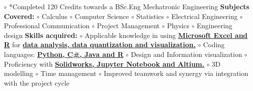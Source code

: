 \documentclass[10pt,a4paper,ragged2e,withhyper]{altacv}
\begin{document}
\begin{adjustbox}{valign=t}
\begin{minipage}{0.6\textwidth}
\begin{description}
                          \textcolor{ColorOne}{$\circ$} *Completed 120 Credits towards a BSc.Eng Mechatronic Engineering \hfill\break  
                         \textbf{  Subjects Covered:}\hfill\break
 								\textcolor{ColorOne}{$\circ$} Calculus\hfill\break
 								\textcolor{ColorOne}{$\circ$} Computer Science\hfill\break
 								\textcolor{ColorOne}{$\circ$} Statistics\hfill\break
 								\textcolor{ColorOne}{$\circ$} Electrical Engineering\hfill\break
 								\textcolor{ColorOne}{$\circ$} Professional Communication\hfill\break
 								\textcolor{ColorOne}{$\circ$} Project Management\hfill\break
 								\textcolor{ColorOne}{$\circ$} Physics\hfill\break
 								\textcolor{ColorOne}{$\circ$} Engineering design\hfill\break
								\textbf{Skills acquired:}\hfill\break
 								\textcolor{ColorOne}{$\circ$} Applicable knowledge in using \underline{\textbf{Microsoft Excel and R}} for \underline{\textbf{data analysis, data quantization and visualization.}}\hfill\break
 								\textcolor{ColorOne}{$\circ$} Coding languages: \underline{\textbf{Python, C\#, Java and R}}\hfill\break
 								\textcolor{ColorOne}{$\circ$} Design and Information visualization\hfill\break
 								\textcolor{ColorOne}{$\circ$} Proficiency with \underline{\textbf{Solidworks, Jupyter Notebook and Altium.}}\hfill\break
 								\textcolor{ColorOne}{$\circ$} 3D modelling\hfill\break
 								\textcolor{ColorOne}{$\circ$} Time management\hfill\break
          						\textcolor{ColorOne}{$\circ$} Improved teamwork and synergy via integration with the project cycle\hfill\break
                        \end{description}
                        
        \end{minipage}
    \end{adjustbox}
    
\end{document}
